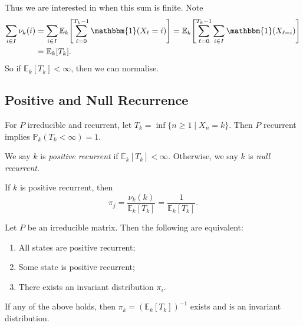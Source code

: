 \documentclass[12pt]{article}
\begin{document}
Thus we are interested in when this sum is finite. Note
\begin{align*}
	\sum_{i \in I}\nu_k(i) &= \sum_{i \in I}\mathbb{E}_k\Biggl[\sum_{\ell = 0}^{T_k - 1}\mathbbm{1}(X_{\ell} = i) \Biggr] = \mathbb{E}_k\Biggl[\sum_{\ell = 0}^{T_k - 1}\sum_{i \in I} \mathbbm{1}(X_{\ell = i})\Biggr] \\
			       &= \mathbb{E}_k[T_k].
\end{align*}
So if $\mathbb{E}_k[T_k] < \infty$, then we can normalise.

\subsection{Positive and Null Recurrence}%
\label{sub:positive_and_null_recurrence}

\begin{definition}
	For $P$ irreducible and recurrent, let $T_k = \inf\{n \geq 1 \mid X_n = k\}$. Then $P$ recurrent implies $\mathbb{P}_k(T_k < \infty) = 1$.

	We say $k$ is \textit{positive recurrent} if $\mathbb{E}_k[T_k] < \infty$. Otherwise, we say $k$ is \textit{null recurrent}.
\end{definition}

If $k$ is positive recurrent, then
\[
	\pi_j = \frac{\nu_k(k)}{\mathbb{E}_k[T_k]} = \frac{1}{\mathbb{E}_k[T_k]}
.\]

\begin{theorem}
	Let $P$ be an irreducible matrix. Then the following are equivalent:
	\begin{enumerate}[\normalfont(i)]
		\item All states are positive recurrent;
		\item Some state is positive recurrent;
		\item There exists an invariant distribution $\pi_i$.
	\end{enumerate}
	If any of the above holds, then $\pi_k = (\mathbb{E}_k[T_k])^{-1}$ exists and is an invariant distribution.
\end{theorem}
\end{document}
